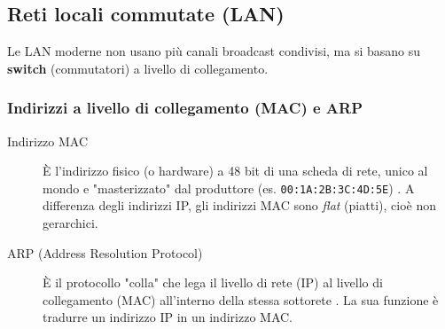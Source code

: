 \subsection{Reti locali commutate (LAN)}
Le LAN moderne non usano più canali broadcast condivisi, ma si basano su \textbf{switch} (commutatori) a livello di collegamento.

\subsubsection{Indirizzi a livello di collegamento (MAC) e ARP}
\begin{description}
    \item[Indirizzo MAC] È l'indirizzo fisico (o hardware) a 48 bit di una scheda di rete, unico al mondo e "masterizzato" dal produttore (es. \texttt{00:1A:2B:3C:4D:5E}) . A differenza degli indirizzi IP, gli indirizzi MAC sono \textit{flat} (piatti), cioè non gerarchici.
    \item[ARP (Address Resolution Protocol)] È il protocollo "colla" che lega il livello di rete (IP) al livello di collegamento (MAC) all'interno della stessa sottorete . La sua funzione è tradurre un indirizzo IP in un indirizzo MAC.
\end{description}

